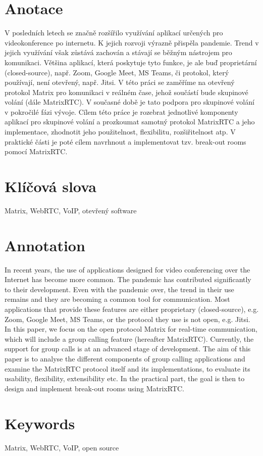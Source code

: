 \section*{Anotace}
V posledních letech se značně rozšířilo využívání aplikací určených pro
videokonference po internetu. K jejich rozvoji výrazně přispěla pandemie. Trend
v jejich využívání však zůstává zachován a stávají se běžným nástrojem pro
komunikaci. Většina aplikací, která poskytuje tyto funkce, je ale buď
proprietární (closed-source), např. Zoom, Google Meet, MS Teams, či protokol,
který používají, není otevřený, např. Jitsi. V této práci se zaměříme na
otevřený protokol Matrix pro komunikaci v reálném čase, jehož součástí bude
skupinové volání (dále MatrixRTC). V současné době je tato podpora pro skupinové
volání v pokročilé fázi vývoje. Cílem této práce je rozebrat jednotlivé
komponenty aplikací pro skupinové volání a prozkoumat samotný protokol MatrixRTC
a jeho implementace, zhodnotit jeho použitelnost, flexibilitu, rozšiřitelnost
atp. V praktické části je poté cílem navrhnout a implementovat tzv. break-out
rooms pomocí MatrixRTC.

\section*{Klíčová slova}
Matrix, WebRTC, VoIP, otevřený software

\section*{Annotation}
In recent years, the use of applications designed for video conferencing over
the Internet has become more common. The pandemic has contributed significantly
to their development. Even with the pandemic over, the trend in their use
remains and they are becoming a common tool for communication. Most applications
that provide these features are either proprietary (closed-source), e.g. Zoom,
Google Meet, MS Teams, or the protocol they use is not open, e.g. Jitsi. In this
paper, we focus on the open protocol Matrix for real-time communication, which
will include a group calling feature (hereafter MatrixRTC). Currently, the
support for group calls is at an advanced stage of development. The aim of this
paper is to analyse the different components of group calling applications and
examine the MatrixRTC protocol itself and its implementations, to evaluate its
usability, flexibility, extensibility etc. In the practical part, the goal is
then to design and implement break-out rooms using MatrixRTC.

\section*{Keywords}
Matrix, WebRTC, VoIP, open source
